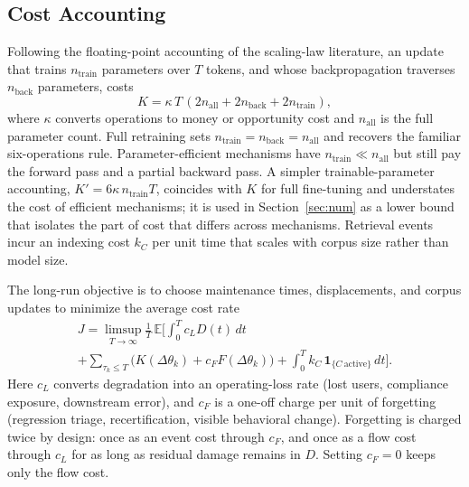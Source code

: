 \documentclass[journal]{IEEEtran}
\newcommand{\E}{\mathbb{E}}
\begin{document}
\subsection{Cost Accounting}
Following the floating-point accounting of the scaling-law literature, an update that trains $n_{\mathrm{train}}$ parameters over $T$ tokens, and whose backpropagation traverses $n_{\mathrm{back}}$ parameters, costs
\begin{equation}
K=\kappa\,T\,(2n_{\mathrm{all}}+2n_{\mathrm{back}}+2n_{\mathrm{train}}),
\end{equation}
where $\kappa$ converts operations to money or opportunity cost and $n_{\mathrm{all}}$ is the full parameter count. Full retraining sets $n_{\mathrm{train}}=n_{\mathrm{back}}=n_{\mathrm{all}}$ and recovers the familiar six-operations rule. Parameter-efficient mechanisms have $n_{\mathrm{train}}\ll n_{\mathrm{all}}$ but still pay the forward pass and a partial backward pass. A simpler trainable-parameter accounting, $K'=6\kappa\,n_{\mathrm{train}}T$, coincides with $K$ for full fine-tuning and understates the cost of efficient mechanisms; it is used in Section~\ref{sec:num} as a lower bound that isolates the part of cost that differs across mechanisms. Retrieval events incur an indexing cost $k_C$ per unit time that scales with corpus size rather than model size.

The long-run objective is to choose maintenance times, displacements, and corpus updates to minimize the average cost rate
\begin{multline}
J=\limsup_{T\to\infty}\frac{1}{T}\,\E\Big[\int_0^T c_L D(t)\,dt\\
+\sum_{\tau_k\le T}\big(K(\Delta\theta_k)+c_F F(\Delta\theta_k)\big)+\int_0^T k_C\,\mathbf 1_{\{C\ \mathrm{active}\}}\,dt\Big].
\end{multline}
Here $c_L$ converts degradation into an operating-loss rate (lost users, compliance exposure, downstream error), and $c_F$ is a one-off charge per unit of forgetting (regression triage, recertification, visible behavioral change). Forgetting is charged twice by design: once as an event cost through $c_F$, and once as a flow cost through $c_L$ for as long as residual damage remains in $D$. Setting $c_F=0$ keeps only the flow cost.
\end{document}
